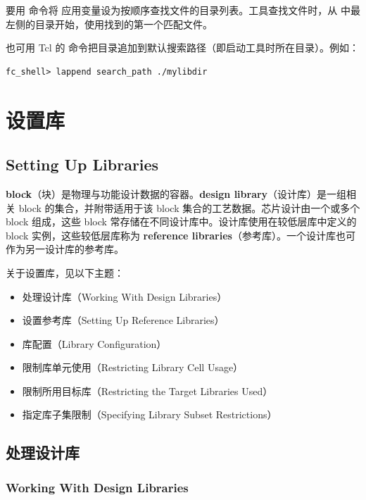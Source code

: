 要用  命令将  应用变量设为按顺序查找文件的目录列表。工具查找文件时，从  中最左侧的目录开始，使用找到的第一个匹配文件。

也可用 Tcl 的  命令把目录追加到默认搜索路径（即启动工具时所在目录）。例如：
\begin{lstlisting}
fc_shell> lappend search_path ./mylibdir
\end{lstlisting}

\section{设置库}
\subsection*{Setting Up Libraries}

\textbf{block}（块）是物理与功能设计数据的容器。\textbf{design library}（设计库）是一组相关 block 的集合，并附带适用于该 block 集合的工艺数据。芯片设计由一个或多个 block 组成，这些 block 常存储在不同设计库中。设计库使用在较低层库中定义的 block 实例，这些较低层库称为 \textbf{reference libraries}（参考库）。一个设计库也可作为另一设计库的参考库。

关于设置库，见以下主题：
\begin{itemize}
  \item 处理设计库（Working With Design Libraries）
  \item 设置参考库（Setting Up Reference Libraries）
  \item 库配置（Library Configuration）
  \item 限制库单元使用（Restricting Library Cell Usage）
  \item 限制所用目标库（Restricting the Target Libraries Used）
  \item 指定库子集限制（Specifying Library Subset Restrictions）
\end{itemize}

\subsection{处理设计库}
\subsubsection*{Working With Design Libraries}


